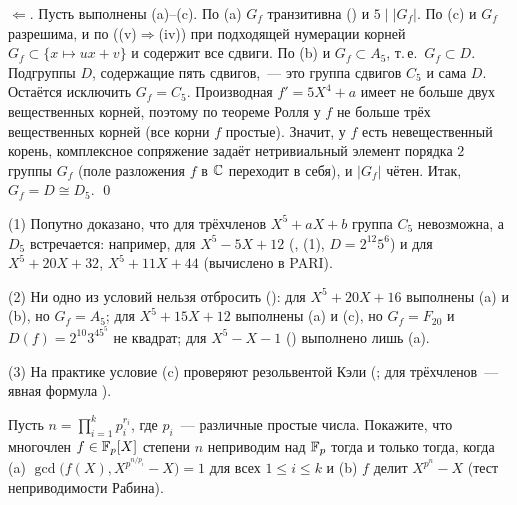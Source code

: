 $\Leftarrow$. Пусть выполнены (a)--(c). По (a) $G_f$ транзитивна () и $5\mid|G_f|$. По (c) и  $G_f$ разрешима, и по
 ((v)$\Rightarrow$(iv)) при подходящей нумерации корней $G_f\subset\{x\mapsto ux+v\}$ и содержит все сдвиги. По (b) и
 $G_f\subset A_5$, т.\,е.\ $G_f\subset D$. Подгруппы $D$, содержащие пять сдвигов,~--- это группа сдвигов $C_5$ и сама $D$.
Остаётся исключить $G_f=C_5$. Производная $f'=5X^4+a$ имеет не больше двух вещественных корней, поэтому по теореме Ролля у $f$
не больше трёх вещественных корней (все корни $f$ простые). Значит, у $f$ есть невещественный корень, комплексное
сопряжение задаёт нетривиальный элемент порядка $2$ группы $G_f$ (поле разложения $f$ в $\mathbb C$ переходит в себя), и
$|G_f|$ чётен. Итак, $G_f=D\cong D_5$. \qed

\begin{remark}
(1) Попутно доказано, что для трёхчленов $X^5+aX+b$ группа $C_5$ невозможна, а $D_5$ встречается: например, для
$X^5-5X+12$ (, (1), $D=2^{12}5^6$) и для $X^5+20X+32$, $X^5+11X+44$ (вычислено в PARI).

(2) Ни одно из условий нельзя отбросить (): для $X^5+20X+16$ выполнены (a) и (b), но $G_f=A_5$; для $X^5+15X+12$
выполнены (a) и (c), но $G_f=F_{20}$ и $D(f)=2^{10}3^45^5$ не квадрат; для $X^5-X-1$ () выполнено лишь (a).

(3) На практике условие (c) проверяют резольвентой Кэли (; для трёхчленов~--- явная формула ).
\end{remark}

\begin{exercise}[4-8]
Пусть $n=\prod_{i=1}^kp_i^{r_i}$, где $p_i$~--- различные простые числа. Покажите, что многочлен $f\in\mathbb F_p[X]$ степени $n$
неприводим над $\mathbb F_p$ тогда и только тогда, когда \textup{(a)} $\gcd\bigl(f(X),X^{p^{n/p_i}}-X\bigr)=1$ для всех $1\le i\le k$
и \textup{(b)} $f$ делит $X^{p^n}-X$ \textup(тест неприводимости Рабина\textup).
\end{exercise}


